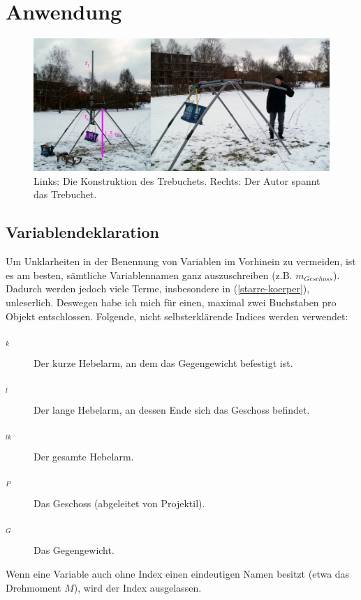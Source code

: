 \chapter{Anwendung}

\begin{figure}[h!]
    \includegraphics[width=\textwidth]{bilder/trebuchet-final}
    \caption{Links: Die Konstruktion des Trebuchets. Rechts: Der Autor spannt das Trebuchet.}
\end{figure}


\section{Variablendeklaration}
Um Unklarheiten in der Benennung von Variablen im Vorhinein zu vermeiden, ist es am besten, sämtliche Variablennamen ganz auszuschreiben (z.B. $m_{Geschoss}$). Dadurch werden jedoch viele Terme, insbesondere in (\ref{starre-koerper}), unleserlich. Deswegen habe ich mich für einen, maximal zwei Buchstaben pro Objekt entschlossen. Folgende, nicht selbsterklärende Indices werden verwendet:
\begin{description}
\item[$_k$] Der kurze Hebelarm, an dem das Gegengewicht befestigt ist.
\item[$_l$] Der lange Hebelarm, an dessen Ende sich das Geschoss befindet.
\item[$_{lk}$] Der gesamte Hebelarm.
\item[$_P$] Das Geschoss (abgeleitet von Projektil).
\item[$_G$] Das Gegengewicht.
\end{description}
Wenn eine Variable auch ohne Index einen eindeutigen Namen besitzt (etwa das Drehmoment $M$), wird der Index ausgelassen.



